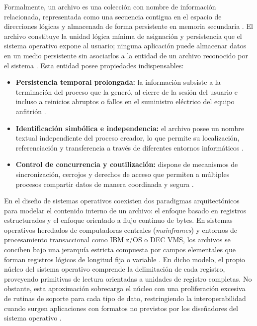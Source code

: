 \documentclass[12pt]{article}
\begin{document}
Formalmente, un archivo es una colección con nombre de información relacionada, representada como una secuencia contigua en el espacio de direcciones lógicas y almacenada de forma persistente en memoria secundaria \parencite[\S 8.2.1, p.\ 421]{carretero2001sistemas}. El archivo constituye la unidad lógica mínima de asignación y persistencia que el sistema operativo expone al usuario; ninguna aplicación puede almacenar datos en un medio persistente sin asociarlos a la entidad de un archivo reconocido por el sistema \parencite[\S 10.1, p.\ 333]{silberschatz2006fundamentos}. Esta entidad posee propiedades indispensables:
\begin{itemize}[noitemsep, topsep=2pt]
    \item \textbf{Persistencia temporal prolongada:} la información subsiste a la terminación del proceso que la generó, al cierre de la sesión del usuario e incluso a reinicios abruptos o fallos en el suministro eléctrico del equipo anfitrión \parencite[\S 12.1, p.\ 551]{stallings2018operating}.
    \item \textbf{Identificación simbólica e independencia:} el archivo posee un nombre textual independiente del proceso creador, lo que permite su localización, referenciación y transferencia a través de diferentes entornos informáticos \parencite[\S 10.1.1, p.\ 334]{silberschatz2006fundamentos}.
    \item \textbf{Control de concurrencia y coutilización:} dispone de mecanismos de sincronización, cerrojos y derechos de acceso que permiten a múltiples procesos compartir datos de manera coordinada y segura \parencite[\S 13.3, p.\ 587]{deitel2004operating}.
\end{itemize}

En el diseño de sistemas operativos coexisten dos paradigmas arquitectónicos para modelar el contenido interno de un archivo: el enfoque basado en registros estructurados y el enfoque orientado a flujo continuo de bytes. En sistemas operativos heredados de computadoras centrales (\textit{mainframes}) y entornos de procesamiento transaccional como IBM z/OS o DEC VMS, los archivos se conciben bajo una jerarquía estricta compuesta por campos elementales que forman registros lógicos de longitud fija o variable \parencite[\S 13.2, pp.\ 586--587]{deitel2004operating}. En dicho modelo, el propio núcleo del sistema operativo comprende la delimitación de cada registro, proveyendo primitivas de lectura orientadas a unidades de registro completas. No obstante, esta aproximación sobrecarga el núcleo con una proliferación excesiva de rutinas de soporte para cada tipo de dato, restringiendo la interoperabilidad cuando surgen aplicaciones con formatos no previstos por los diseñadores del sistema operativo \parencite[\S 10.1, p.\ 341]{silberschatz2006fundamentos}.
\end{document}
